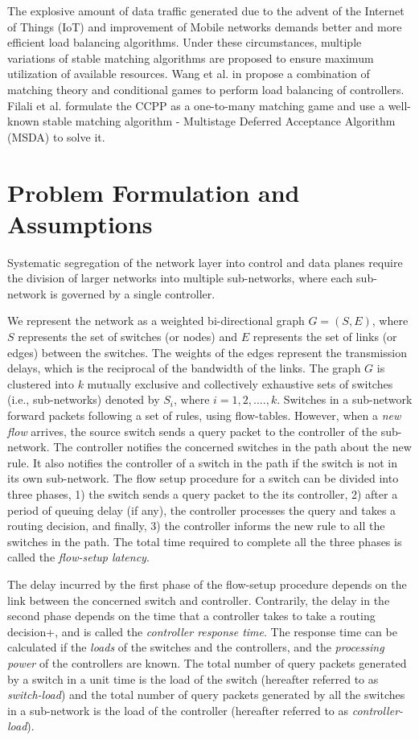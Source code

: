 \documentclass[final,5p,times]{cas-dc}
\begin{document}
	The explosive amount of data traffic generated due to the advent of the Internet of Things (IoT) and improvement of Mobile networks demands better and more efficient load balancing algorithms. Under these circumstances, multiple variations of stable matching algorithms are proposed to ensure maximum utilization of available resources. Wang et al. in \cite{wang2016load} propose a combination of matching theory and conditional games to perform load balancing of controllers. Filali et al. \cite{filali2018sdn} formulate the CCPP as a one-to-many matching game and use a well-known stable matching algorithm - Multistage Deferred Acceptance Algorithm (MSDA) \cite{fragiadakis2016matching} to solve it.
	
	\section{Problem Formulation and Assumptions} \label{sysMod}
	Systematic segregation of the network layer into control and data planes require the division of larger networks into multiple sub-networks, where each sub-network is governed by a single controller.
	
	We represent the network as a weighted bi-directional graph $G=(S,E)$, where $S$ represents the set of switches (or nodes) and $E$ represents the set of links (or edges) between the switches. The weights of the edges represent the transmission delays, which is the reciprocal of the bandwidth of the links. The graph $G$ is clustered into $k$ mutually exclusive and collectively exhaustive sets of switches (i.e., sub-networks) denoted by $S_i$, where $i=1,2,....,k$. Switches in a sub-network forward packets following a set of rules, using flow-tables. However, when a \textit{new flow} arrives, the source switch sends a query packet to the controller of the sub-network. The controller notifies the concerned switches in the path about the new rule. It also notifies the controller of a switch in the path if the switch is not in its own sub-network. The flow setup procedure for a switch can be divided into three phases, 1) the switch sends a query packet to the its controller, 2) after a period of queuing delay (if any), the controller processes the query and takes a routing decision, and finally, 3) the controller informs the new rule to all the switches in the path. The total time required to complete all the three phases is called the \textit{flow-setup latency}.
	
	The delay incurred by the first phase of the flow-setup procedure depends on the link between the concerned switch and controller. Contrarily, the delay in the second phase depends on the time that a controller takes to take a routing decision+, and is called the \textit{controller response time}. The response time can be calculated if the \textit{loads} of the switches and the controllers, and the \textit{processing power} of the controllers are known. The total number of query packets generated by a switch in a unit time is the load of the switch (hereafter referred to as \textit{switch-load}) and the total number of query packets generated by all the switches in a sub-network is the load of the controller (hereafter referred to as \textit{controller-load}).
	
\end{document}
